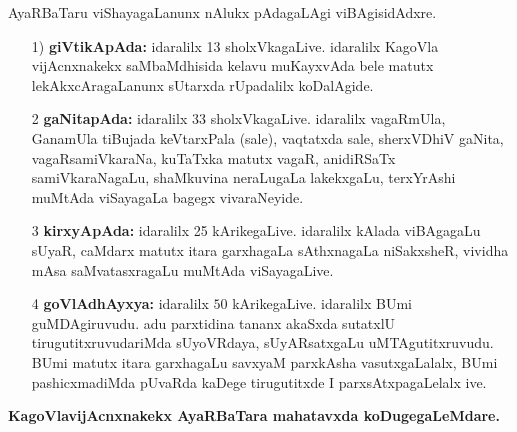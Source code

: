 AyaRBaTaru viShayagaLanunx nAlukx pAdagaLAgi viBAgisidAdxre.
\begin{itemize}
\item[{\rm 1)}] {\bf giVtikApAda:} idaralilx {\rm 13} sholxVkagaLive. idaralilx KagoVla vijAcnxnakekx saMbaMdhisida kelavu muKayxvAda bele matutx lekAkxcAragaLanunx sUtarxda rUpadalilx koDalAgide.

\item[{\rm 2}] {\bf gaNitapAda:} idaralilx {\rm 33} sholxVkagaLive. idaralilx vagaRmUla, GanamUla tiBujada keVtarxPala (sale), vaqtatxda sale, sherxVDhiV gaNita, vagaRsamiVkaraNa, kuTaTxka matutx vagaR, anidiRSaTx samiVkaraNagaLu, shaMkuvina neraLugaLa lakekxgaLu, terxYrAshi muMtAda viSayagaLa bagegx vivaraNeyide. 
  
\item[{\rm 3}] {\bf kirxyApAda:} idaralilx {\rm 25} kArikegaLive. idaralilx kAlada viBAgagaLu sUyaR, caMdarx matutx itara garxhagaLa sAthxnagaLa niSakxsheR, vividha mAsa saMvatasxragaLu muMtAda viSayagaLive.
 
\item[{\rm 4}] {\bf goVlAdhAyxya:} idaralilx $50$ kArikegaLive. idaralilx BUmi guMDAgiruvudu. adu parxtidina tananx akaSxda sutatxlU tirugutitxruvudariMda sUyoVRdaya, sUyARsatxgaLu uMTAgutitxruvudu. BUmi matutx itara garxhagaLu savxyaM parxkAsha vasutxgaLalalx, BUmi pashicxmadiMda pUvaRda kaDege tirugutitxde I parxsAtxpagaLelalx ive.
  \end{itemize}


\noindent
{\bf KagoVlavijAcnxnakekx AyaRBaTara mahatavxda koDugegaLeMdare.}

